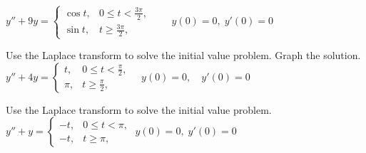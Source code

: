 \documentclass{ximera}
\begin{document}
\begin{problem}\label{exer:8.5.8} $y''+9y= \left\{\begin{array}{cl} \cos
t,&0\le t<\frac{3\pi}{2},\\ \sin
t,&t\ge\frac{3\pi}{2},\end{array}\right.\qquad y(0)=0,\;  y'(0)=0$
\end{problem}

\begin{problem}\label{exer:8.5.9} Use the Laplace transform to solve the initial value problem.  Graph the solution. 
$y''+4y= \left\{\begin{array}{cl} t,&0\le
t<\frac{\pi}{2},\\ \pi,&t\ge\frac{\pi}{2},
\end{array}\right.\quad y(0)=0,\quad y'(0)=0$
\end{problem}

\begin{problem}\label{exer:8.5.10}
Use the Laplace transform to solve the initial value problem.
$y''+y=\left\{\begin{array}{cl}-t,&0\le t<\pi,
\\ -t,&t\ge\pi ,\end{array}\right.\;  y(0)=0,\;  y'(0)=0$
\end{problem}
\end{document}

